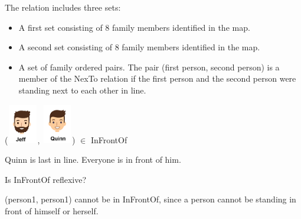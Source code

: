 \documentclass{ximera}
\begin{document}
\begin{exercise}

  \begin{definition}
  The  relation includes three sets:
    \begin{itemize}
    \item A first set consisting of 8 family members identified in the map.
    \item A second set consisting of 8 family members identified in the map.
    \item A set of family ordered pairs. The pair (first person, second person) is a member of the NexTo relation if the first person and the second person were standing next to each other in line.
    \end{itemize}
  \end{definition}


 ({\includegraphics[width=50px,height=65px]{pics/people/jeff.png}}, {\includegraphics[width=50px,height=65px]{pics/people/quinn.png}}) $\in$ InFrontOf 

  \begin{multipleChoice}
  \end{multipleChoice}
  \begin{feedback}
Quinn is last in line. Everyone is in front of him.
  \end{feedback}
\end{exercise}



\begin{exercise}
Is InFrontOf reflexive?

  \begin{multipleChoice}
  \end{multipleChoice}
  \begin{feedback}
  (person1, person1) cannot be in InFrontOf, since a person cannot be standing in front of himself or herself.
  \end{feedback}
\end{exercise}
\end{document}
